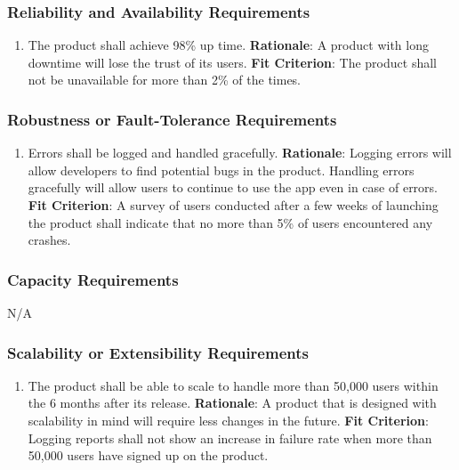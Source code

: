 \documentclass[12pt]{article}
\begin{document}
\subsubsection{Reliability and Availability Requirements}
\begin{enumerate}[nfr]
    \item The product shall achieve 98\% up time.
    \newline \textbf{Rationale}: A product with long downtime will lose the trust of its users.
    \newline \textbf{Fit Criterion}: The product shall not be unavailable for more than 2\% of the times. 
\end{enumerate}

\subsubsection{Robustness or Fault-Tolerance Requirements}
\begin{enumerate}[nfr]
    \item Errors shall be logged and handled gracefully. 
    \newline \textbf{Rationale}: Logging errors will allow developers to find potential bugs in the product. Handling errors gracefully will allow users to continue to use the app even in case of errors.
    \newline \textbf{Fit Criterion}: A survey of users conducted after a few weeks of launching the product shall indicate that no more than 5\% of users encountered any crashes.
\end{enumerate}

\subsubsection{Capacity Requirements}
N/A

\subsubsection{Scalability or Extensibility Requirements}
\begin{enumerate}[nfr]
  \item The product shall be able to scale to handle more than 50,000 users within the 6 months after its release. 
  \newline \textbf{Rationale}: A product that is designed with scalability in mind will require less changes in the future.
  \newline \textbf{Fit Criterion}: Logging reports shall not show an increase in failure rate when more than 50,000 users have signed up on the product.
\end{enumerate}
\end{document}
